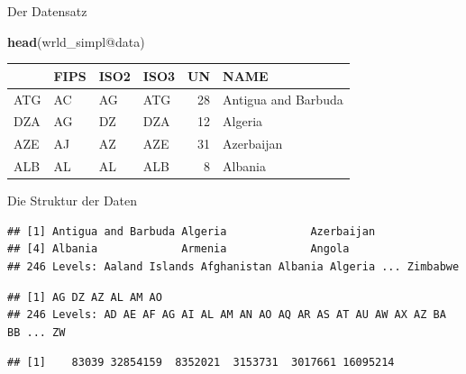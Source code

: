 \documentclass[ignorenonframetext,]{beamer}
\newenvironment{Shaded}{\begin{snugshade}}{\end{snugshade}}
\newcommand{\KeywordTok}[1]{\textcolor[rgb]{0.26,0.66,0.93}{\textbf{#1}}}
\newcommand{\OperatorTok}[1]{\textcolor[rgb]{0.74,0.68,0.62}{#1}}
\newcommand{\NormalTok}[1]{\textcolor[rgb]{0.74,0.68,0.62}{#1}}
\begin{document}
\begin{frame}[fragile]{Der Datensatz}

\begin{Shaded}
\begin{Highlighting}[]
\KeywordTok{head}\NormalTok{(wrld_simpl}\OperatorTok{@}\NormalTok{data)}
\end{Highlighting}
\end{Shaded}

\begin{longtable}[]{@{}llllrl@{}}
\toprule
& FIPS & ISO2 & ISO3 & UN & NAME\tabularnewline
\midrule
\endhead
ATG & AC & AG & ATG & 28 & Antigua and Barbuda\tabularnewline
DZA & AG & DZ & DZA & 12 & Algeria\tabularnewline
AZE & AJ & AZ & AZE & 31 & Azerbaijan\tabularnewline
ALB & AL & AL & ALB & 8 & Albania\tabularnewline
\bottomrule
\end{longtable}

\end{frame}

\begin{frame}[fragile]{Die Struktur der Daten}

\begin{Shaded}
\end{Shaded}

\begin{verbatim}
## [1] Antigua and Barbuda Algeria             Azerbaijan         
## [4] Albania             Armenia             Angola             
## 246 Levels: Aaland Islands Afghanistan Albania Algeria ... Zimbabwe
\end{verbatim}

\begin{Shaded}
\end{Shaded}

\begin{verbatim}
## [1] AG DZ AZ AL AM AO
## 246 Levels: AD AE AF AG AI AL AM AN AO AQ AR AS AT AU AW AX AZ BA BB ... ZW
\end{verbatim}

\begin{Shaded}
\end{Shaded}

\begin{verbatim}
## [1]    83039 32854159  8352021  3153731  3017661 16095214
\end{verbatim}

\end{frame}
\end{document}
